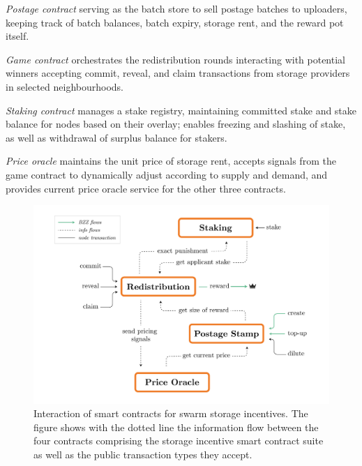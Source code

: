 \begin{labelledlist}
    \item[\emph{Postage contract}] serving as the batch store to sell postage batches to uploaders, keeping track of batch balances, batch expiry, storage rent, and the reward pot itself.
    \item[\emph{Game contract}] orchestrates the redistribution rounds interacting with potential winners accepting commit, reveal, and claim transactions from storage providers in selected neighbourhoods.
    \item[\emph{Staking contract}] manages a stake registry, maintaining committed stake and stake balance for nodes based on their overlay; enables freezing and slashing of stake, as well as withdrawal of surplus balance for stakers.
    \item[\emph{Price oracle}] maintains the unit price of  storage rent, accepts signals from the game contract to dynamically adjust according to supply and demand, and provides current price oracle service for the other three contracts.
\end{labelledlist}


\begin{figure}[!ht]
  \centering
     \includegraphics[width=\textwidth]{fig/smart-contract-interaction.pdf}
  \caption[Interaction of smart contracts for swarm storage incentives]{Interaction of smart contracts for swarm storage incentives. The figure shows with the dotted line the information flow between the four contracts comprising the storage incentive smart contract suite as well as the public transaction types they accept. }
\label{fig:smart-contracts}
\end{figure}    


